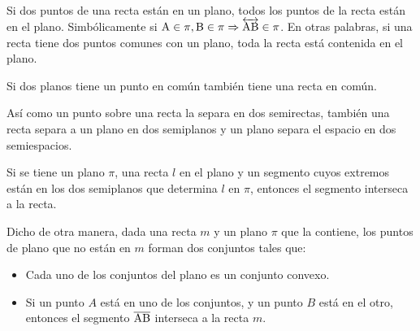 \begin{postulate}
    Si dos puntos de una recta están en un plano, todos los puntos de la recta están en el plano. Simbólicamente si $\rm A \in \pi, \rm B \in \pi \Rightarrow \overleftrightarrow{\rm AB} \in \pi$. En otras palabras, si una recta tiene dos puntos comunes con un plano, toda la recta está contenida en el plano.
    
    \begin{figure}[!h]
        \centering
        
        \label{fig:postulate8}
    \end{figure}
    
\end{postulate}

\clearpage

\begin{postulate}
    Si dos planos tiene un punto en común también tiene una recta en común.
    
    \begin{figure}[!h]
        \centering
        
        \label{fig:postulate9}
    \end{figure}
    
\end{postulate}

\begin{postulate}
    Así como un punto sobre una recta la separa en dos semirectas, también una recta separa a un plano en dos semiplanos y un plano separa el espacio en dos semiespacios.
    
    \begin{figure}[!h]
        \centering
        
        \label{fig:postulate16}
    \end{figure}
\end{postulate}

\begin{postulate}
    Si se tiene un plano $\pi$, una recta $l$ en el plano y un segmento cuyos extremos están en los dos semiplanos que determina $l$ en $\pi$, entonces el segmento interseca a la recta.
    
    \begin{figure}[!h]
        \centering
        
        \label{fig:postulate17}
    \end{figure}

    Dicho de otra manera, dada una recta $m$ y un plano $\pi$ que la contiene, los puntos de plano que no están en $m$ forman dos conjuntos tales que:

    \begin{itemize}
        \item Cada uno de los conjuntos del plano es un conjunto convexo.
        \item Si un punto $A$ está en uno de los conjuntos, y un punto $B$ está en el otro, entonces el segmento $\overline{\rm AB}$ interseca a la recta $m$.
    \end{itemize}
    
\end{postulate}

